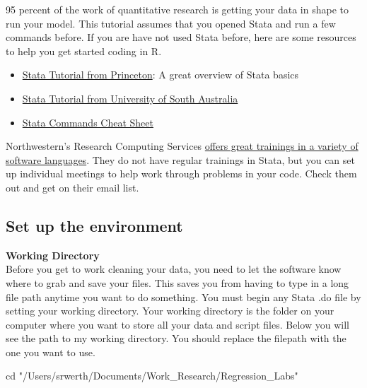 \documentclass[
]{book}
\newenvironment{Shaded}{\begin{snugshade}}{\end{snugshade}}
\newcommand{\NormalTok}[1]{#1}
\newcommand{\StringTok}[1]{\textcolor[rgb]{0.31,0.60,0.02}{#1}}
\providecommand{\tightlist}{%
  \setlength{\itemsep}{0pt}\setlength{\parskip}{0pt}}
\begin{document}
95 percent of the work of quantitative research is getting your data in shape to run your model. This tutorial assumes that you opened Stata and run a few commands before. If you are have not used Stata before, here are some resources to help you get started coding in R.

\begin{itemize}
\tightlist
\item
  \href{https://www.princeton.edu/~otorres/StataTutorial.pdf}{Stata Tutorial from Princeton}: A great overview of Stata basics\\
\item
  \href{https://lo.unisa.edu.au/mod/book/view.php?id=641259}{Stata Tutorial from University of South Australia}
\item
  \href{https://www.stata.com/links/resources-for-learning-stata/cheat-sheets/StataCheatsheet_processing_June_2016_TE-REV.pdf}{Stata Commands Cheat Sheet}
\end{itemize}

Northwestern's Research Computing Services \href{https://www.it.northwestern.edu/research/training.html}{offers great trainings in a variety of software languages}. They do not have regular trainings in Stata, but you can set up individual meetings to help work through problems in your code. Check them out and get on their email list.

\hypertarget{cd}{%
\subsection*{Set up the environment}\label{cd}}

\textbf{Working Directory}\\
Before you get to work cleaning your data, you need to let the software know where to grab and save your files. This saves you from having to type in a long file path anytime you want to do something. You must begin any Stata .do file by setting your working directory. Your working directory is the folder on your computer where you want to store all your data and script files. Below you will see the path to my working directory. You should replace the filepath with the one you want to use.

\begin{Shaded}
\begin{Highlighting}[]
\NormalTok{cd }\StringTok{"/Users/srwerth/Documents/Work\_Research/Regression\_Labs"}
\end{Highlighting}
\end{Shaded}
\end{document}
